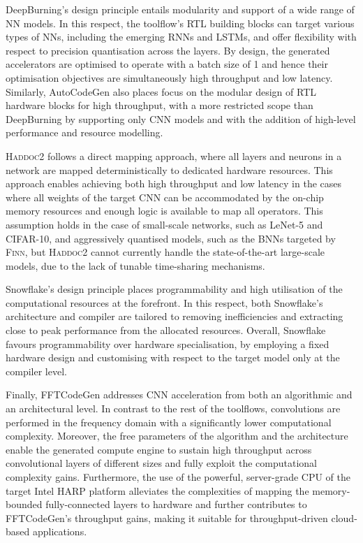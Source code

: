 \documentclass[format=acmsmall, review=false, screen=true]{acmart}
\begin{document}
DeepBurning's design principle entails modularity and support of a wide range of NN models. In this respect, the toolflow's RTL building blocks can target various types of NNs, including the emerging RNNs and LSTMs, and offer flexibility with respect to precision quantisation across the layers. By design, the generated accelerators are optimised to operate with a batch size of 1 and hence their optimisation objectives are simultaneously high throughput and low latency. {\color{black}Similarly, AutoCodeGen also places focus on the modular design of RTL hardware blocks for high throughput, with a more restricted scope than DeepBurning by supporting only CNN models and with the addition of high-level performance and resource modelling.}

{\color{black}\textsc{Haddoc2} follows a direct mapping approach, where all layers and neurons in a network are mapped deterministically to dedicated hardware resources. This approach enables achieving both high throughput and low latency in the cases where all weights of the target CNN can be accommodated by the on-chip memory resources and enough logic is available to map all operators. This assumption holds in the case of small-scale networks, such as LeNet-5 and CIFAR-10, and aggressively quantised models, such as the BNNs targeted by \textsc{Finn}, but \textsc{Haddoc2} cannot currently handle the state-of-the-art large-scale models, due to the lack of tunable time-sharing mechanisms.}

{\color{black}Snowflake's design principle places programmability and high utilisation of the computational resources at the forefront. In this respect, both Snowflake's architecture and compiler are tailored to removing inefficiencies and extracting close to peak performance from the allocated resources. Overall, Snowflake favours programmability over hardware specialisation, by employing a fixed hardware design and customising with respect to the target model only at the compiler level.}

{\color{black}Finally, FFTCodeGen addresses CNN acceleration from both an algorithmic and an architectural level. In contrast to the rest of the toolflows, convolutions are performed in the frequency domain with a significantly lower computational complexity. Moreover, the free parameters of the algorithm and the architecture enable the generated compute engine to sustain high throughput across convolutional layers of different sizes and fully exploit the computational complexity gains. Furthermore, the use of the powerful, server-grade CPU of the target Intel HARP platform alleviates the complexities of mapping the memory-bounded fully-connected layers to hardware and further contributes to FFTCodeGen's throughput gains, making it suitable for throughput-driven cloud-based applications.}
\end{document}
